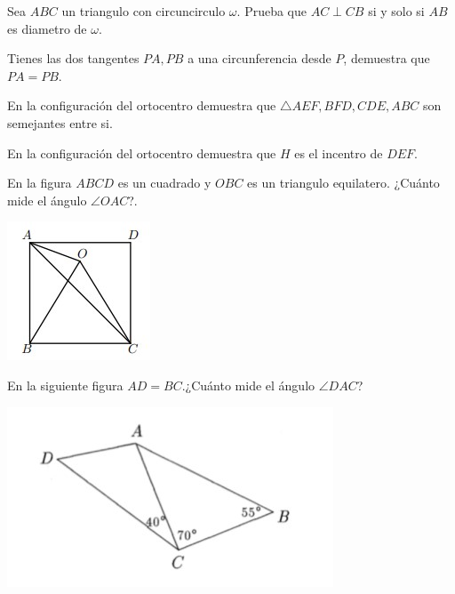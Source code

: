 \documentclass[11pt]{scrartcl}
\newcommand{\thmdifficulty}{0}
\newcommand{\problemdiff}[1]{\renewcommand{\thmdifficulty}{#1}}
\begin{document}
\problemdiff{0}
\begin{problema}
    Sea $ABC$ un triangulo con circuncirculo $\omega$. Prueba que $AC \perp CB $ si y solo si $AB$ es diametro de $\omega$.
\end{problema}

\problemdiff{0}
\begin{problema}
    Tienes las dos tangentes $PA, PB$ a una circunferencia desde $P$, demuestra que $PA=PB$.
\end{problema}

\problemdiff{0.5}
\begin{problema}
    En la configuraci\'on del ortocentro demuestra que $\triangle AEF,BFD,CDE,ABC $ son semejantes entre si.
\end{problema}

\problemdiff{0.5}
\begin{problema}
    En la configuraci\'on del ortocentro demuestra que $H$ es el incentro de $DEF$.
\end{problema}

\problemdiff{1}
\begin{problema}
En la figura $ABCD$ es un cuadrado y $OBC$ es un triangulo equilatero. ¿Cuánto mide el ángulo $\angle OAC$?.
\begin{center}
    \includegraphics[]{I2.jpg}
\end{center}
\end{problema}



\problemdiff{1}
\begin{problema}  En la siguiente figura $AD=BC$.¿Cuánto mide el ángulo $\angle DAC$?
\begin{center}
  \includegraphics[scale=0.9]{I1.jpg}  
\end{center}
\end{problema}
\end{document}
